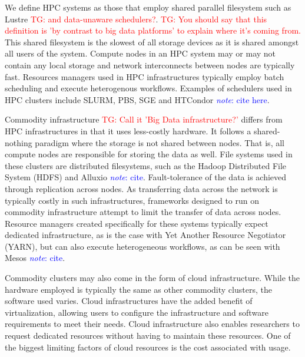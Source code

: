\documentclass{report}
\newcommand{\note}[1]{\textcolor{blue}{\textit{note}: #1}}
\newcommand{\tristan}[1]{\textcolor{red}{TG: #1}}
\begin{document}
            We define HPC systems as those that employ shared parallel 
            filesystem such as Lustre \tristan{and data-unaware schedulers?}.
            \tristan{You should say that this definition is 'by contrast to big data platforms' to explain where it's coming from.}
            This shared filesystem is the slowest of
            all storage devices as it is shared amongst all users of the system.
            Compute nodes in an HPC system may or may not contain any local 
            storage and network interconnects between nodes are typically fast.
            Resources managers used in HPC infrastructures typically employ 
            batch scheduling and execute heterogenous workflows. 
            Examples of schedulers used in HPC clusters 
            include SLURM, PBS, SGE and HTCondor \note{cite here}.

            Commodity infrastructure \tristan{Call it 'Big Data infrastructure?'} differs from HPC infrastructures in that
            it uses less-costly hardware. It follows a shared-nothing paradigm
            where the storage is not shared between nodes. That is, all compute
            nodes are responsible for storing the data as well. File systems
            used in these clusters are distributed filesystems, such as the
            Hadoop Distributed File System (HDFS) and Alluxio \note{cite}.
            Fault-tolerance of the data is achieved through replication across
            nodes. As transferring data across the network is typically costly 
            in such infrastructures, frameworks designed to run on commodity 
            infrastructure attempt to limit the transfer of data across nodes. 
            Resource managers created specifically for these systems
            typically expect dedicated infrastructure, as is the case with 
            Yet Another Resource Negotiator (YARN), but can also execute 
            heterogeneous workflows, as can be seen with Mesos \note{cite}.

            Commodity clusters may also come in the form of cloud infrastructure.
            While the hardware employed is typically the same as other
            commodity clusters, the software used varies. Cloud infrastructures
            have the added benefit of virtualization, allowing users to 
            configure the infrastructure and software requirements to meet their
            needs. Cloud infrastructure also enables researchers to request
            dedicated resources without having to maintain these resources. One
            of the biggest limiting factors of cloud resources is the cost 
            associated with usage.
\end{document}
